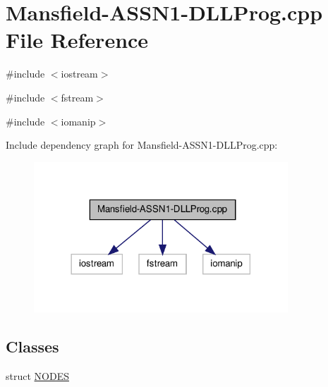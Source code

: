 \hypertarget{_mansfield-_a_s_s_n1-_d_l_l_prog_8cpp}{
\section{Mansfield-\/ASSN1-\/DLLProg.cpp File Reference}
\label{_mansfield-_a_s_s_n1-_d_l_l_prog_8cpp}
}
{\ttfamily \#include $<$iostream$>$}\par
{\ttfamily \#include $<$fstream$>$}\par
{\ttfamily \#include $<$iomanip$>$}\par
Include dependency graph for Mansfield-\/ASSN1-\/DLLProg.cpp:
\nopagebreak
\begin{figure}[H]
\begin{center}
\leavevmode
\includegraphics[width=270pt]{_mansfield-_a_s_s_n1-_d_l_l_prog_8cpp__incl}
\end{center}
\end{figure}
\subsection*{Classes}
\begin{DoxyCompactItemize}
\item 
struct \hyperlink{struct_n_o_d_e_s}{NODES}
\end{DoxyCompactItemize}
